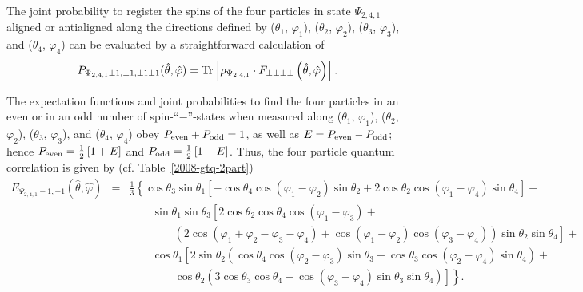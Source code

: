 \documentclass[pra,amsfonts,showpacs,showkeys,preprint]{revtex4}
\begin{document}
The joint probability to register the spins of the four particles
in state $\Psi_{2,4,1}$
aligned or antialigned along the directions defined by
($\theta_1$, $\varphi_1 $),
($\theta_2$, $\varphi_2 $),
($\theta_3$, $\varphi_3 $),  and
($\theta_4$, $\varphi_4 $) can be evaluated by a straightforward calculation
of
\begin{equation}
P_{{\Psi_{2,4,1}} \pm 1 ,\pm 1,\pm 1\pm 1} ({\hat \theta},{\hat \varphi} )=
{\rm Tr}\left[\rho_{\Psi_{2,4,1}} \cdot F_{\pm \pm \pm \pm} \left({\hat \theta},{\hat \varphi} \right)\right].
\end{equation}

The expectation functions and joint probabilities to find the four particles
in an even or in an odd number of
spin-``$-$''-states when measured along
($\theta_1$, $\varphi_1 $),
($\theta_2$, $\varphi_2 $),
($\theta_3$, $\varphi_3 $),  and
($\theta_4$, $\varphi_4 $)
obey  $P_{ \rm even} + P_{ \rm odd}=1$,
as well as $E= P_{ \rm even} - P_{ \rm odd}$; hence
$
P_{ \rm even} =
{1\over2}\left[1 + E  \right]
$
and
$
P_{\rm odd} =
{1\over2}\left[1 - E  \right]
$.
Thus, the four particle quantum correlation is given by (cf. Table~\ref{2008-gtq-2part})
\begin{equation}
\begin{array}{rcl}
E_{ \Psi_{2,4,1}-1,+1}({\hat \theta} , {\hat \varphi } )  &=&
\frac{1}{3}
\left\{
\cos \theta_3 \sin \theta_1
\left[
-\cos \theta_4 \cos (\varphi_1 - \varphi_2) \sin \theta_2 +
          2 \cos \theta_2 \cos (\varphi_1 - \varphi_4) \sin \theta_4
\right] +
\right.
\\
&&\qquad
    \sin \theta_1 \sin \theta_3
\left[2 \cos \theta_2 \cos \theta_4 \cos (\varphi_1 - \varphi_3)  +
\right.
\\
&&\qquad
\qquad
\left.
\left(
2 \cos (\varphi_1 + \varphi_2 - \varphi_3 - \varphi_4) +
                \cos (\varphi_1 - \varphi_2)
                \cos (\varphi_3 - \varphi_4)
\right) \sin \theta_2 \sin \theta_4
\right]   +
\\
&&\qquad
    \cos \theta_1
\left[
2 \sin \theta_2
\left(
\cos \theta_4 \cos (\varphi_2 - \varphi_3) \sin \theta_3 +
                \cos \theta_3 \cos (\varphi_2 - \varphi_4) \sin \theta_4
\right) \right.
 +
\\
&&\qquad
\qquad
\left.
\left.
\cos \theta_2
\left(3 \cos \theta_3 \cos \theta_4 -
                \cos (\varphi_3 - \varphi_4) \sin \theta_3
\sin \theta_4
\right)
\right]
\right\} .
\end{array}
\label{2009-gtq-fpqcgen}
\end{equation}
\end{document}
